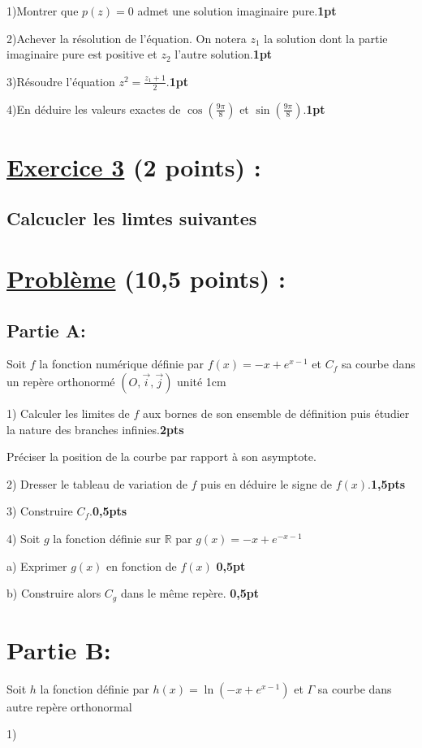 \documentclass{article}
\begin{document}
1)Montrer que $p(z)=0$ admet une solution imaginaire pure.\textbf{1pt}

2)Achever la résolution de l’équation. On notera $z_{1}$ la solution dont la partie imaginaire pure est positive et $z_{2}$ l’autre solution.\textbf{1pt}

3)Résoudre l’équation $z^{2}=\frac{z_{1}+1}{2}$.\textbf{1pt}

4)En déduire les valeurs exactes de $\cos(\frac{9\pi}{8})$ et $\sin(\frac{9\pi}{8})$.\textbf{1pt}
\section*{\underline{Exercice 3} (2 points) :}
\subsection*{Calcucler les limtes suivantes}
\section*{\underline{Problème} (10,5 points) :}
\subsection*{Partie A:}
Soit $f$ la fonction numérique définie par $f(x)=-x+e^{x-1}$  et $C_{f}$ sa courbe dans un repère orthonormé $(O,\vec{i},\vec{j})$ unité 1cm

1) Calculer les limites de $f$ aux bornes de son ensemble de définition puis étudier la nature des branches infinies.\textbf{2pts}

Préciser la position de la courbe par rapport à son asymptote.

2) Dresser le tableau de variation de $f$ puis en déduire le signe de $f(x)$.\textbf{1,5pts}

3) Construire $C_{f}$.\textbf{0,5pts}

4) Soit $g$ la fonction définie sur $\mathbb{R}$ par $g(x)=-x+e^{-x-1}$

  a) Exprimer $g(x)$ en fonction de $f(x)$ \textbf{0,5pt}
  
  b) Construire alors $C_{g}$ dans le même repère.  \textbf{0,5pt}
\section*{Partie B:}
Soit $h$ la fonction définie par $h(x)=\ln(-x+e^{x-1})$  et $\Gamma$ sa courbe dans autre repère orthonormal

1)
\end{document}
